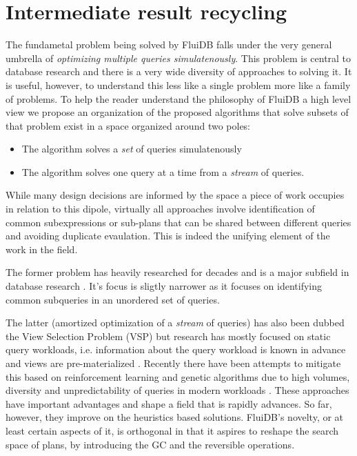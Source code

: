 \section{Intermediate result recycling}
\label{sec:org9f362bb}

The fundametal problem being solved by FluiDB falls under the very
general umbrella of \emph{optimizing multiple queries simulatenously}. This
problem is central to database research and there is a very wide
diversity of approaches to solving it. It is useful, however, to
understand this less like a single problem more like a family of
problems. To help the reader understand the philosophy of FluiDB a
high level view we propose an organization of the proposed algorithms
that solve subsets of that problem exist in a space organized around
two poles:

\begin{itemize}
\item The algorithm solves a \emph{set} of queries simulatenously
\item The algorithm solves one query at a time from a \emph{stream} of queries.
\end{itemize}

While many design decisions are informed by the space a piece of work
occupies in relation to this dipole, virtually all approaches involve
identification of common subexpressions or sub-plans that can be
shared between different queries and avoiding duplicate
evaulation. This is indeed the unifying element of the work in the
field.

The former problem has heavily researched for decades and is a major
 subfield in database research \cite{sellisMultipleQueryOptimization1987,royEfficientExtensibleAlgorithms2000,ComputingQueriesDerived}. It's
 focus is sligtly narrower as it focuses on identifying common
 subqueries in an unordered set of queries.

The latter (amortized optimization of a \emph{stream} of queries) has also
been dubbed the View Selection Problem (VSP) but research has mostly
focused on static query workloads, i.e. information about the query
workload is known in advance and views are pre-materialized
\cite{phanDynamicMaterializationQuery2008a}. Recently there have been
attempts to mitigate this based on reinforcement learning
\cite{yuanAutomaticViewGeneration2020a} and genetic
algorithms\cite{vijaykumarMaterializedViewSelection2012,zhangGeneticAlgorithmMaterialized1999,bayirGeneticAlgorithmMultipleQuery2007}
due to high volumes, diversity and unpredictability of queries in
modern workloads \cite{liMachineLearningDatabases2021a}. These
approaches have important advantages and shape a field that is rapidly
advances. So far, however, they improve on the heuristics based
solutions. FluiDB's novelty, or at least certain aspects of it, is
orthogonal in that it aspires to reshape the search space of plans, by
introducing the GC and the reversible operations.

